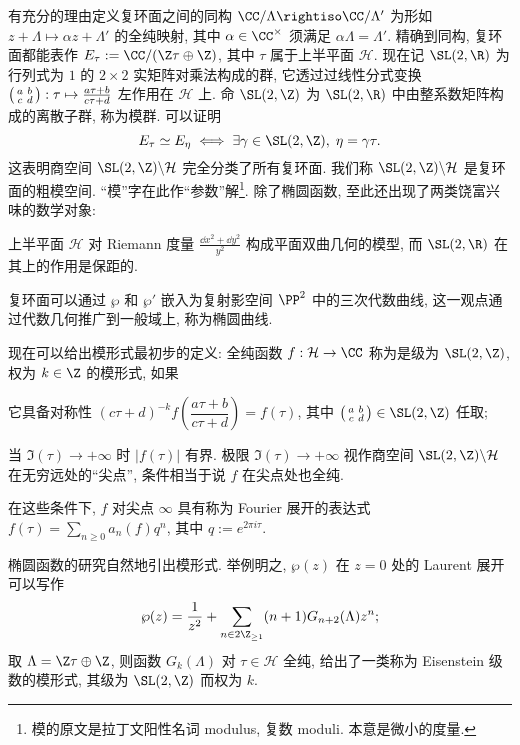 有充分的理由定义复环面之间的同构 $\CC/\Lambda \rightiso \CC/\Lambda'$ 为形如 $z + \Lambda \mapsto \alpha z + \Lambda'$ 的全纯映射, 其中 $\alpha \in \CC^\times$ 须满足 $\alpha\Lambda = \Lambda'$. 精确到同构, 复环面都能表作 $E_\tau := \CC/(\Z\tau \oplus \Z)$, 其中 $\tau$ 属于上半平面 $\mathcal{H}$. 现在记 $\SL(2, \R)$ 为行列式为 $1$ 的 $2 \times 2$ 实矩阵对乘法构成的群, 它透过过线性分式变换 $\bigl(\begin{smallmatrix} a & b \\ c & d \end{smallmatrix}\bigr): \tau \mapsto \frac{a\tau + b}{c\tau + d}$ 左作用在 $\mathcal{H}$ 上. 命 $\SL(2, \Z)$ 为 $\SL(2, \R)$ 中由整系数矩阵构成的离散子群, 称为模群. 可以证明
\[ E_\tau \simeq E_\eta \iff \exists \gamma \in \SL(2, \Z), \; \eta = \gamma\tau.  \]
这表明商空间 $\SL(2, \Z) \backslash \mathcal{H}$ 完全分类了所有复环面. 我们称 $\SL(2, \Z) \backslash \mathcal{H}$ 是复环面的粗模空间. ``模''字在此作``参数''解\footnote{模的原文是拉丁文阳性名词 modulus, 复数 moduli. 本意是微小的度量.}. 除了椭圆函数, 至此还出现了两类饶富兴味的数学对象:
\begin{compactitem}
	\item 上半平面 $\mathcal{H}$ 对 Riemann 度量 $\frac{\dd x^2 + \dd y^2}{y^2}$ 构成平面双曲几何的模型, 而 $\SL(2, \R)$ 在其上的作用是保距的.

	\item 复环面可以通过 $\wp$ 和 $\wp'$ 嵌入为复射影空间 $\PP^2$ 中的三次代数曲线, 这一观点通过代数几何推广到一般域上, 称为椭圆曲线.
\end{compactitem}

现在可以给出模形式最初步的定义: 全纯函数 $f: \mathcal{H} \to \CC$ 称为是级为 $\SL(2, \Z)$, 权为 $k \in \Z$ 的模形式, 如果
\begin{compactitem}
	\item 它具备对称性 $(c\tau + d)^{-k} f\left( \dfrac{a\tau+b}{c\tau+d} \right) = f(\tau)$, 其中 $\twomatrix{a}{b}{c}{d} \in \SL(2,\Z)$ 任取;
	\item 当 $\Im(\tau) \to +\infty$ 时 $|f(\tau)|$ 有界. 极限 $\Im(\tau) \to +\infty$ 视作商空间 $\SL(2, \Z) \backslash \mathcal{H}$ 在无穷远处的``尖点'', 条件相当于说 $f$ 在尖点处也全纯.
\end{compactitem}
在这些条件下, $f$ 对尖点 $\infty$ 具有称为 Fourier 展开的表达式 $f(\tau) = \sum_{n \geq 0} a_n(f) q^n$, 其中 $q := e^{2\pi i\tau}$.

椭圆函数的研究自然地引出模形式. 举例明之, $\wp(z)$ 在 $z=0$ 处的 Laurent 展开可以写作
\[ \wp(z) = \dfrac{1}{z^2} + \sum_{n \in 2\Z_{\geq 1}} (n+1) G_{n+2}(\Lambda) z^n; \]
取 $\Lambda = \Z\tau \oplus \Z$, 则函数 $G_k(\Lambda)$ 对 $\tau \in \mathcal{H}$ 全纯, 给出了一类称为 Eisenstein 级数的模形式, 其级为 $\SL(2, \Z)$ 而权为 $k$.

